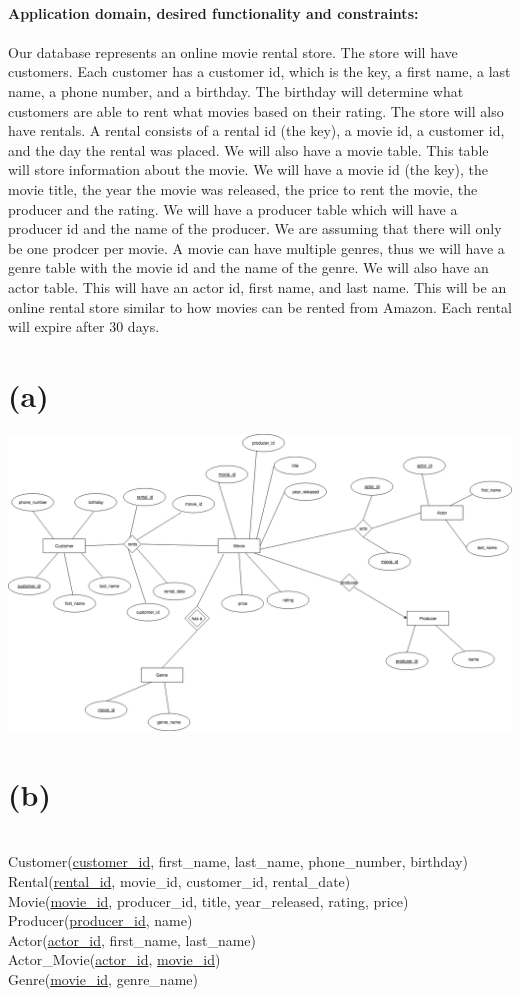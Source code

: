\documentclass{article}
\begin{document}
\setlength{\headheight}{30pt}
\thispagestyle{fancy}
$ $ \\
\textbf{Application domain, desired functionality and constraints:} \\ \\
Our database represents an online movie rental store. The store will have customers. Each customer has a customer id, which is the key, a first name, a last name, a phone number, and a birthday. The birthday will determine what customers are able to rent what movies based on their rating. The store will also have rentals. A rental consists of a rental id (the key), a movie id, a customer id, and the day the rental was placed. We will also have a movie table. This table will store information about the movie. We will have a movie id (the key), the movie title, the year the movie was released, the price to rent the movie, the producer and the rating. We will have a producer table which will have a producer id and the name of the producer. We are assuming that there will only be one prodcer per movie. A movie can have multiple genres, thus we will have a genre table with the movie id and the name of the genre. We will also have an actor table. This will have an actor id, first name, and last name. This will be an online rental store similar to how movies can be rented from Amazon. Each rental will expire after 30 days.

\section*{(a)}
\includegraphics[scale = 0.3]{moviedb.png}

\section*{(b)}
$ $ \\
Customer(\underline{customer\_id}, first\_name, last\_name, phone\_number, birthday) \\
Rental(\underline{rental\_id}, movie\_id, customer\_id, rental\_date) \\
Movie(\underline{movie\_id}, producer\_id, title, year\_released, rating, price) \\
Producer(\underline{producer\_id}, name) \\
Actor(\underline{actor\_id}, first\_name, last\_name) \\
Actor\_Movie(\underline{actor\_id}, \underline{movie\_id}) \\
Genre(\underline{movie\_id}, genre\_name)
\end{document}
